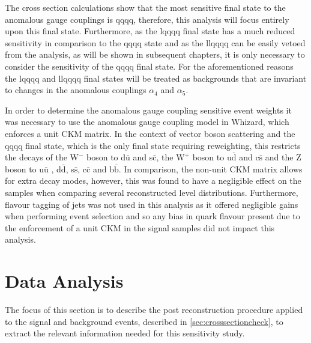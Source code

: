The cross section calculations show that the most sensitive final state to the anomalous gauge couplings is \nu{\nu}qqqq, therefore, this analysis will focus entirely upon this final state.  Furthermore, as the l{\nu}qqqq final state has a much reduced sensitivity in comparison to the \nu{\nu}qqqq state and as the llqqqq can be easily vetoed from the analysis, as will be shown in subsequent chapters, it is only necessary to consider the sensitivity of the \nu{\nu}qqqq final state.  For the aforementioned reasons the l{\nu}qqqq and llqqqq final states will be treated as backgrounds that are invariant to changes in the anomalous couplings $\alpha_{4}$ and $\alpha_{5}$.  

In order to determine the anomalous gauge coupling sensitive event weights it was necessary to use the anomalous gauge coupling model in Whizard, which enforces a unit CKM matrix.  In the context of vector boson scattering and the \nu{\nu}qqqq final state, which is the only final state requiring reweighting, this restricts the decays of the $\text{W}^{-}$ boson to d$\bar{\text{u}}$ and s$\bar{\text{c}}$, the $\text{W}^{+}$ boson to u$\bar{\text{d}}$ and c$\bar{\text{s}}$ and the Z boson to u$\bar{\text{u}}$ , d$\bar{\text{d}}$, s$\bar{\text{s}}$, c$\bar{\text{c}}$ and b$\bar{\text{b}}$.  In comparison, the non-unit CKM matrix allows for extra decay modes, however, this was found to have a negligible effect on the samples when comparing several reconstructed level distributions.  Furthermore, flavour tagging of jets was not used  in this analysis as it offered negligible gains when performing event selection and so any bias in quark flavour present due to the enforcement of a unit CKM in the signal samples did not impact this analysis.  


\section{Data Analysis}
\label{sec:dataanalysis}
The focus of this section is to describe the post reconstruction procedure applied to the signal and background events, described in \ref{sec:crosssectioncheck}, to extract the relevant information needed for this sensitivity study. 


